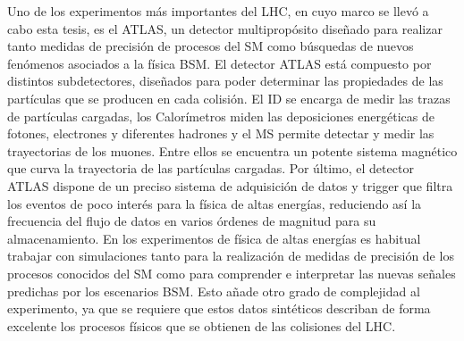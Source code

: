 Uno de los experimentos más importantes del \ac{LHC}, en cuyo marco se llevó a cabo esta tesis, es el \ac{ATLAS}, un detector multipropósito diseñado para realizar tanto medidas de precisión de procesos del \ac{SM} como búsquedas de nuevos fenómenos asociados a la física \acl{BSM}. El detector \ac{ATLAS} está compuesto por distintos subdetectores, diseñados para poder determinar las propiedades de las partículas que se producen en cada colisión. El \acl{ID} se encarga de medir las trazas de partículas cargadas, los Calorímetros miden las deposiciones energéticas de fotones, electrones y diferentes hadrones y el \acl{MS} permite detectar y medir las trayectorias de los muones. Entre ellos se encuentra un potente sistema magnético que curva la trayectoria de las partículas cargadas. Por último, el detector \ac{ATLAS} dispone de un preciso sistema de adquisición de datos y  trigger que filtra los eventos de poco interés para la física de altas energías, reduciendo así la frecuencia del flujo de datos en varios órdenes de magnitud para su almacenamiento. En los experimentos de física de altas energías es habitual trabajar con simulaciones tanto para la realización de medidas de precisión de los procesos conocidos del \ac{SM} como para comprender e interpretar las nuevas señales predichas por los escenarios \ac{BSM}. Esto añade otro grado de complejidad al experimento, ya que se requiere que estos datos sintéticos describan de forma excelente los procesos físicos que se obtienen de las colisiones del \ac{LHC}. 


